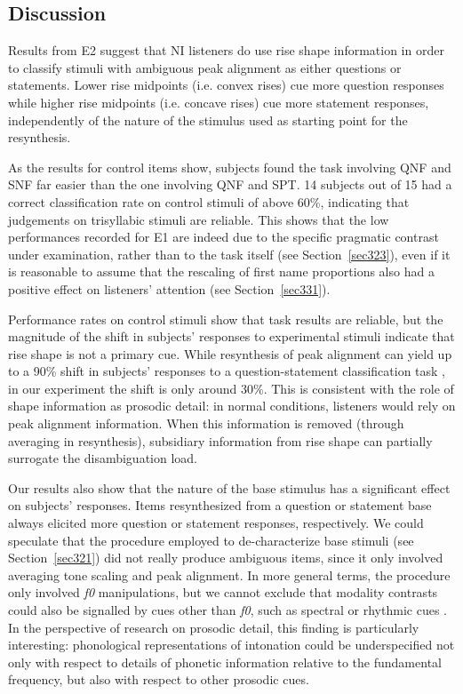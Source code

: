\subsection{Discussion}\label{sec333}
Results from E2 suggest that NI listeners do use rise shape information in order to classify stimuli with ambiguous peak alignment as either questions or statements. Lower rise midpoints (i.e. convex rises) cue more question responses while higher rise midpoints (i.e. concave rises) cue more statement responses, independently of the nature of the stimulus used as starting point for the resynthesis.

As the results for control items show, subjects found the task involving QNF and SNF far easier than the one involving QNF and SPT. 14 subjects out of 15 had a correct classification rate on control stimuli of above 60\%, indicating that judgements on trisyllabic stimuli are reliable. This shows that the low performances recorded for E1 are indeed due to the specific pragmatic contrast under examination, rather than to the task itself (see Section~\ref{sec323}), even if it is reasonable to assume that the rescaling of first name proportions also had a positive effect on listeners' attention (see Section~\ref{sec331}).

Performance rates on control stimuli show that task results are reliable, but the magnitude of the shift in subjects' responses to experimental stimuli indicate that rise shape is not a primary cue. While resynthesis of peak alignment can yield up to a 90\% shift in subjects' responses to a question-statement classification task \citep[§3, \textit{inter alia}]{dimperio2000role}, in our experiment the shift is only around 30\%. This is consistent with the role of shape information as prosodic detail: in normal conditions, listeners would rely on peak alignment information. When this information is removed (through averaging in resynthesis), subsidiary information from rise shape can partially surrogate the disambiguation load.

Our results also show that the nature of the base stimulus has a significant effect on subjects' responses. Items resynthesized from a question or statement base always elicited more question or statement responses, respectively. We could speculate that the procedure employed to de-characterize base stimuli (see Section~\ref{sec321}) did not really produce ambiguous items, since it only involved averaging tone scaling and peak alignment. In more general terms, the procedure only involved \textit{f0} manipulations, but we cannot exclude that modality contrasts could also be signalled by cues other than \textit{f0}, such as spectral or rhythmic cues \citep[§5, \textit{inter alia}]{niebuhr2010pitchaccent,dimperio2000role}. In the perspective of research on prosodic detail, this finding is particularly interesting: phonological representations of intonation could be underspecified not only with respect to details of phonetic information relative to the fundamental frequency, but also with respect to other prosodic cues.

